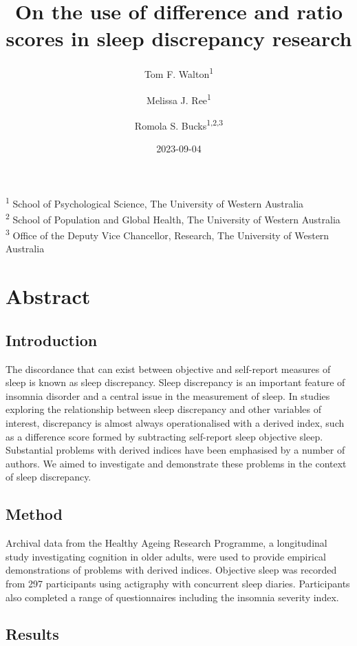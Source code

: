 \documentclass[
]{article}
\title{On the use of difference and ratio scores in sleep discrepancy research}
\author{Tom F. Walton\textsuperscript{1} \and Melissa J. Ree\textsuperscript{1} \and Romola S. Bucks\textsuperscript{1,2,3}}
\date{2023-09-04}
\begin{document}
\maketitle

\textsuperscript{1} School of Psychological Science, The University of Western Australia\\
\textsuperscript{2} School of Population and Global Health, The University of Western Australia\\
\textsuperscript{3} Office of the Deputy Vice Chancellor, Research, The University of Western Australia

\section{Abstract}\label{abstract}

\subsection{Introduction}\label{introduction}

The discordance that can exist between objective and self-report measures of sleep is known as sleep discrepancy. Sleep discrepancy is an important feature of insomnia disorder and a central issue in the measurement of sleep. In studies exploring the relationship between sleep discrepancy and other variables of interest, discrepancy is almost always operationalised with a derived index, such as a difference score formed by subtracting self-report sleep objective sleep. Substantial problems with derived indices have been emphasised by a number of authors. We aimed to investigate and demonstrate these problems in the context of sleep discrepancy.

\subsection{Method}\label{method}

Archival data from the Healthy Ageing Research Programme, a longitudinal study investigating cognition in older adults, were used to provide empirical demonstrations of problems with derived indices. Objective sleep was recorded from 297 participants using actigraphy with concurrent sleep diaries. Participants also completed a range of questionnaires including the insomnia severity index.

\subsection{Results}\label{results}
\end{document}

